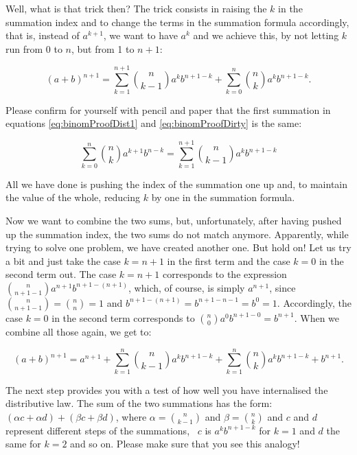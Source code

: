 \documentclass{scrreprt}
\begin{document}
Well, what is that trick then?
The trick consists in raising the $k$
in the summation index and to change the terms
in the summation formula accordingly,
that is, instead of $a^{k+1}$, we want to have $a^k$
and we achieve this, by not letting $k$ 
run from 0 to $n$,
but from 1 to $n+1$:

\begin{equation}\label{eq:binomProofDirty}
  (a + b)^{n + 1} = \sum_{k=1}^{n+1}{\binom{n}{k-1}a^{k}b^{n+1-k}} +
                    \sum_{k=0}^{n}{\binom{n}{k}a^kb^{n+1-k}}.
\end{equation}

Please confirm for yourself with pencil and paper 
that the first summation in equations 
\ref{eq:binomProofDist1} and \ref{eq:binomProofDirty}
is the same:

\[
  \sum_{k=0}^{n}{\binom{n}{k}a^{k+1}b^{n-k}} =
  \sum_{k=1}^{n+1}{\binom{n}{k-1}a^{k}b^{n+1-k}} 
\]

All we have done is pushing the index of the summation one up
and, to maintain the value of the whole, reducing $k$ by one
in the summation formula.

Now we want to combine the two sums,
but, unfortunately, 
after having pushed up the summation index,
the two sums do not match anymore.
Apparently, while trying to solve one problem,
we have created another one.
But hold on!
Let us try a bit
and just take the case $k=n+1$ in the first term
and the case $k=0$ in the second term out.
The case $k=n+1$ corresponds to the expression
$\binom{n}{n+1-1}a^{n+1}b^{n+1-(n+1)}$,
which, of course, is simply $a^{n+1}$,
since $\binom{n}{n+1-1} = \binom{n}{n} = 1$
and $b^{n+1-(n+1)} = b^{n+1-n-1} = b^0 = 1$.
Accordingly, the case $k=0$ in the second term
corresponds to
$\binom{n}{0}a^0b^{n+1-0} = b^{n+1}$.
When we combine all those again, we get to:

\begin{equation}
  (a + b)^{n + 1} = a^{n+1} + 
                    \sum_{k=1}^{n}{\binom{n}{k-1}a^{k}b^{n+1-k}} +
                    \sum_{k=1}^{n}{\binom{n}{k}a^kb^{n+1-k}} +
                    b^{n+1}.
\end{equation}

The next step provides you with a test
of how well you have internalised
the distributive law.
The sum of the two summations has the form:
$(\alpha c + \alpha d) + (\beta c + \beta d)$,
where $\alpha = \binom{n}{k-1}$ 
and   $\beta  = \binom{n}{k}$
and $c$ and $d$ represent 
different steps of the summations,
\ie\ $c$ is $a^kb^{n+1-k}$ for $k = 1$ 
and $d$ the same for $k=2$ and so on.
Please make sure that you see this analogy!
\end{document}
